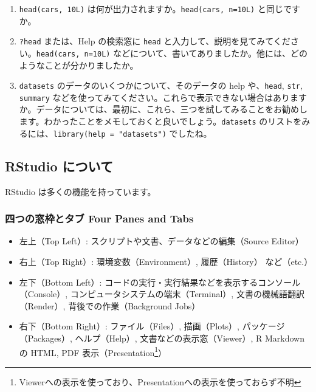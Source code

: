 \documentclass[
]{bxjsbook}
\providecommand{\tightlist}{%
  \setlength{\itemsep}{0pt}\setlength{\parskip}{0pt}}
\theoremstyle{definition}
\theoremstyle{definition}
\theoremstyle{definition}
\theoremstyle{definition}
\theoremstyle{remark}
\begin{document}
\begin{enumerate}
\def\labelenumi{\arabic{enumi}.}
\tightlist
\item
  \texttt{head(cars,\ 10L)} は何が出力されますか。\texttt{head(cars,\ n=10L)} と同じですか。
\item
  \texttt{?head} または、Help の検索窓に \texttt{head} と入力して、説明を見てみてください。\texttt{head(cars,\ n=10L)} などについて、書いてありましたか。他には、どのようなことが分かりましたか。
\item
  \texttt{datasets} のデータのいくつかについて、そのデータの help や、\texttt{head}, \texttt{str}, \texttt{summary} などを使ってみてください。これらで表示できない場合はありますか。データについては、最初に、これら、三つを試してみることをお勧めします。わかったことをメモしておくと良いでしょう。\texttt{datasets} のリストをみるには、\texttt{library(help\ =\ "datasets")} でしたね。
\end{enumerate}

\hypertarget{rstudio-ux306bux3064ux3044ux3066}{%
\subsection{RStudio について}\label{rstudio-ux306bux3064ux3044ux3066}}

RStudio は多くの機能を持っています。

\hypertarget{ux56dbux3064ux306eux7a93ux67a0ux3068ux30bfux30d6-four-panes-and-tabs}{%
\subsubsection{四つの窓枠とタブ Four Panes and Tabs}\label{ux56dbux3064ux306eux7a93ux67a0ux3068ux30bfux30d6-four-panes-and-tabs}}

\begin{itemize}
\tightlist
\item
  左上（Top Left）: スクリプトや文書、データなどの編集（Source Editor）
\item
  右上（Top Right）: 環境変数（Environment）, 履歴（History） など（etc.）
\item
  左下（Bottom Left）: コードの実行・実行結果などを表示するコンソール（Console）, コンピュータシステムの端末（Terminal）, 文書の機械語翻訳（Render）, 背後での作業（Background Jobs）
\item
  右下（Bottom Right）: ファイル（Files）, 描画（Plots）, パッケージ（Packages）, ヘルプ（Help）, 文書などの表示窓（Viewer）, R Markdown の HTML, PDF 表示（Presentation\footnote{Viewerへの表示を使っており、Presentationへの表示を使っておらず不明}）
\end{itemize}
\end{document}
